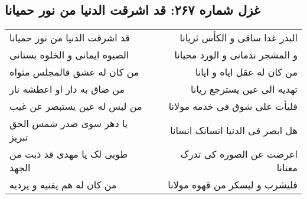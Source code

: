 \begin{center}
\section*{غزل شماره ۲۶۷: قد اشرقت الدنیا من نور حمیانا}
\label{sec:0267}
\begin{longtable}{l p{0.5cm} r}
قد اشرقت الدنیا من نور حمیانا
&&
البدر غدا ساقی و الکأس ثریانا
\\
الصبوه ایمانی و الخلوه بستانی
&&
و المشجر ندمانی و الورد محیانا
\\
من کان له عشق فالمجلس مثواه
&&
من کان له عقل ایاه و ایانا
\\
من ضاق به دار او اعطشه نار
&&
تهدیه الی عین یسترجع ریانا
\\
من لیس له عین یستبصر عن غیب
&&
فلیأت علی شوق فی خدمه مولانا
\\
یا دهر سوی صدر شمس الحق تبریز
&&
هل ابصر فی الدنیا انسانک انسانا
\\
طوبی لک یا مهدی قد ذبت من الجهد
&&
اعرضت عن الصوره کی تدرک معنانا
\\
من کان له هم یفنیه و یردیه
&&
فلیشرب و لیسکر من قهوه مولانا
\\
\end{longtable}
\end{center}
